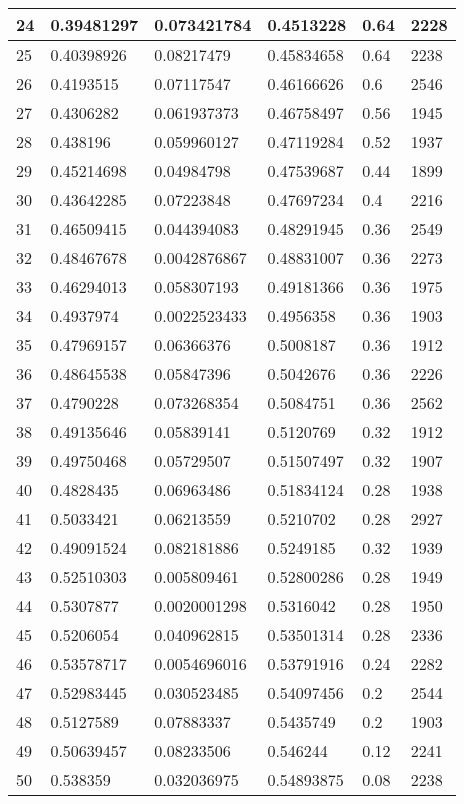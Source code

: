 \begin{longtable}{|l|l|l|l|l|l|}
24 & 0.39481297 & 0.073421784 & 0.4513228 & 0.64 & 2228 \\ \hline 
25 & 0.40398926 & 0.08217479 & 0.45834658 & 0.64 & 2238 \\ \hline 
26 & 0.4193515 & 0.07117547 & 0.46166626 & 0.6 & 2546 \\ \hline 
27 & 0.4306282 & 0.061937373 & 0.46758497 & 0.56 & 1945 \\ \hline 
28 & 0.438196 & 0.059960127 & 0.47119284 & 0.52 & 1937 \\ \hline 
29 & 0.45214698 & 0.04984798 & 0.47539687 & 0.44 & 1899 \\ \hline 
30 & 0.43642285 & 0.07223848 & 0.47697234 & 0.4 & 2216 \\ \hline 
31 & 0.46509415 & 0.044394083 & 0.48291945 & 0.36 & 2549 \\ \hline 
32 & 0.48467678 & 0.0042876867 & 0.48831007 & 0.36 & 2273 \\ \hline 
33 & 0.46294013 & 0.058307193 & 0.49181366 & 0.36 & 1975 \\ \hline 
34 & 0.4937974 & 0.0022523433 & 0.4956358 & 0.36 & 1903 \\ \hline 
35 & 0.47969157 & 0.06366376 & 0.5008187 & 0.36 & 1912 \\ \hline 
36 & 0.48645538 & 0.05847396 & 0.5042676 & 0.36 & 2226 \\ \hline 
37 & 0.4790228 & 0.073268354 & 0.5084751 & 0.36 & 2562 \\ \hline 
38 & 0.49135646 & 0.05839141 & 0.5120769 & 0.32 & 1912 \\ \hline 
39 & 0.49750468 & 0.05729507 & 0.51507497 & 0.32 & 1907 \\ \hline 
40 & 0.4828435 & 0.06963486 & 0.51834124 & 0.28 & 1938 \\ \hline 
41 & 0.5033421 & 0.06213559 & 0.5210702 & 0.28 & 2927 \\ \hline 
42 & 0.49091524 & 0.082181886 & 0.5249185 & 0.32 & 1939 \\ \hline 
43 & 0.52510303 & 0.005809461 & 0.52800286 & 0.28 & 1949 \\ \hline 
44 & 0.5307877 & 0.0020001298 & 0.5316042 & 0.28 & 1950 \\ \hline 
45 & 0.5206054 & 0.040962815 & 0.53501314 & 0.28 & 2336 \\ \hline 
46 & 0.53578717 & 0.0054696016 & 0.53791916 & 0.24 & 2282 \\ \hline 
47 & 0.52983445 & 0.030523485 & 0.54097456 & 0.2 & 2544 \\ \hline 
48 & 0.5127589 & 0.07883337 & 0.5435749 & 0.2 & 1903 \\ \hline 
49 & 0.50639457 & 0.08233506 & 0.546244 & 0.12 & 2241 \\ \hline 
50 & 0.538359 & 0.032036975 & 0.54893875 & 0.08 & 2238 \\ \hline 
\end{longtable}